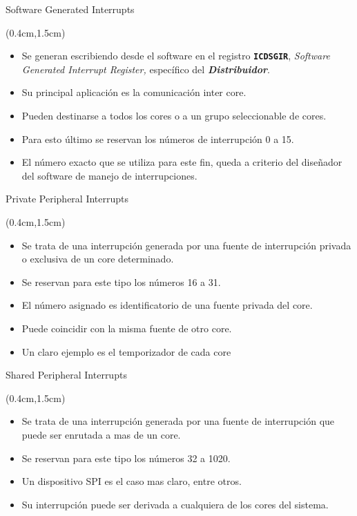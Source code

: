\documentclass[usenames,table,xcolor={x11names},aspectratio=169]{beamer}
\begin{document}
\begin{frame}[t]{Software Generated Interrupts}
 \begin{textblock*}{\textwidth}(0.4cm,1.5cm)
  \begin{itemize}[<+(1)->]\justifying \parskip 0.2cm
   \item Se generan escribiendo desde el software en el registro \texttt{\textbf{ICDSGIR}}, \textit{Software Generated Interrupt Register,} específico del \textbf{\textit{Distribuidor}}.
   \item Su principal aplicación es la comunicación inter core.
   \item Pueden destinarse a todos los cores o a un grupo seleccionable de cores. 
   \item Para esto último se reservan los números de interrupción 0 a 15.
   \item El número exacto que se utiliza para este fin, queda a criterio del diseñador del software de manejo de interrupciones.
  \end{itemize}
 \end{textblock*}
\end{frame}

\begin{frame}[t]{Private Peripheral Interrupts}
 \begin{textblock*}{\textwidth}(0.4cm,1.5cm)
  \begin{itemize}[<+(1)->]\justifying \parskip 0.2cm
   \item Se trata de una interrupción generada por una fuente de interrupción privada o exclusiva de un core determinado.
   \item Se reservan para este tipo los números 16 a 31.
   \item El número asignado es identificatorio de una fuente privada del core. 
   \item Puede coincidir con la misma fuente de otro core.
   \item Un claro ejemplo es el temporizador de cada core
  \end{itemize}
 \end{textblock*}
\end{frame}

\begin{frame}[t]{Shared Peripheral Interrupts}
 \begin{textblock*}{\textwidth}(0.4cm,1.5cm)
  \begin{itemize}[<+(1)->]\justifying \parskip 0.2cm
   \item Se trata de una interrupción generada por una fuente de interrupción que puede ser enrutada a mas de un core.
   \item Se reservan para este tipo los números 32 a 1020.
   \item Un dispositivo SPI es el caso mas claro, entre otros.
   \item Su interrupción puede ser derivada a cualquiera de los cores del sistema.
  \end{itemize}
 \end{textblock*}
\end{frame}
\end{document}
